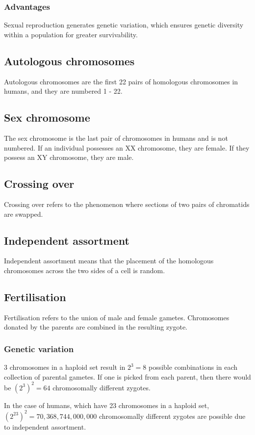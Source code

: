 \documentclass[11pt]{article}
\begin{document}
\subsubsection{Advantages}
\label{sec:org99e853f}
Sexual reproduction generates genetic variation, which ensures genetic diversity within a population for greater survivability.
\subsection{Autologous chromosomes}
\label{sec:org1e73886}
Autologous chromosomes are the first 22 pairs of homologous chromosomes in humans, and they are numbered 1 - 22.
\subsection{Sex chromosome}
\label{sec:org20b2243}
The sex chromosome is the last pair of chromosomes in humans and is not numbered. If an individual possesses an XX chromosome, they are female. If they possess an XY chromosome, they are male.
\subsection{Crossing over}
\label{sec:org37a8040}
Crossing over refers to the phenomenon where sections of two pairs of chromatids are swapped.
\subsection{Independent assortment}
\label{sec:orgcbc1d6f}
Independent assortment means that the placement of the homologous chromosomes across the two sides of a cell is random.
\subsection{Fertilisation}
\label{sec:org3b2fcff}
Fertilisation refers to the union of male and female gametes. Chromosomes donated by the parents are combined in the resulting zygote.
\subsubsection{Genetic variation}
\label{sec:org232bd07}
3 chromosomes in a haploid set result in \(2^3 = 8\) possible combinations in each collection of parental gametes. If one is picked from each parent, then there would be \((2^3)^2 = 64\) chromosomally different zygotes.


In the case of humans, which have 23 chromosomes in a haploid set, \((2^{23})^2 = 70,368,744,000,000\) chromosomally different zygotes are possible due to independent assortment.
\end{document}
